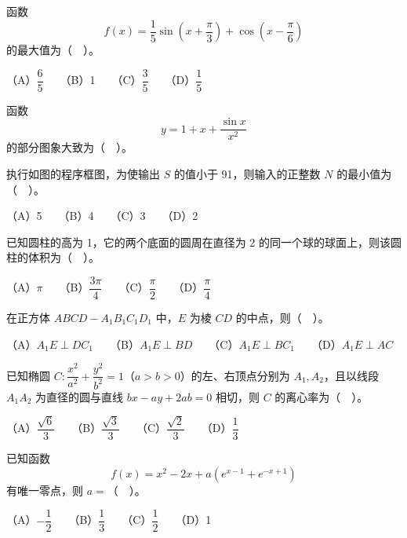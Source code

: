 \begin{question}
函数
\nopagebreak[4]
\[
f(x)=\frac{1}{5}\sin\left(x+\frac{\pi}{3}\right)+\cos\left(x-\frac{\pi}{6}\right)
\]
的最大值为（　）。

（A）\(\dfrac{6}{5}\)　　（B）1　　（C）\(\dfrac{3}{5}\)　　（D）\(\dfrac{1}{5}\)

\Needspace{0.4\textheight}
\end{question}
\begin{question}
函数
\nopagebreak[4]
\[
y=1+x+\frac{\sin x}{x^2}
\]
的部分图象大致为（　）。
\nopagebreak[4]
\begin{center}\end{center}
\nopagebreak[4]
\Needspace{0.4\textheight}
\end{question}
\begin{question}
执行如图的程序框图，为使输出 \(S\) 的值小于 91，则输入的正整数 \(N\) 的最小值为（　）。
\nopagebreak[4]
\begin{center}\end{center}
\nopagebreak[4]
（A）5　　（B）4　　（C）3　　（D）2

\end{question}
\begin{question}
已知圆柱的高为 1，它的两个底面的圆周在直径为 2 的同一个球的球面上，则该圆柱的体积为（　）。

（A）\(\pi\)　　（B）\(\dfrac{3\pi}{4}\)　　（C）\(\dfrac{\pi}{2}\)　　（D）\(\dfrac{\pi}{4}\)

\end{question}
\begin{question}
在正方体 \(ABCD-A_1B_1C_1D_1\) 中，\(E\) 为棱 \(CD\) 的中点，则（　）。

（A）\(A_1E\perp DC_1\)　　（B）\(A_1E\perp BD\)　　（C）\(A_1E\perp BC_1\)　　（D）\(A_1E\perp AC\)

\end{question}
\begin{question}
已知椭圆 \(C:\dfrac{x^2}{a^2}+\dfrac{y^2}{b^2}=1\)（\(a>b>0\)）的左、右顶点分别为 \(A_1,A_2\)，且以线段 \(A_1A_2\) 为直径的圆与直线 \(bx-ay+2ab=0\) 相切，则 \(C\) 的离心率为（　）。

（A）\(\dfrac{\sqrt{6}}{3}\)　　（B）\(\dfrac{\sqrt{3}}{3}\)　　（C）\(\dfrac{\sqrt{2}}{3}\)　　（D）\(\dfrac{1}{3}\)

\end{question}
\begin{question}
已知函数
\nopagebreak[4]
\[
f(x)=x^2-2x+a\left(e^{x-1}+e^{-x+1}\right)
\]
有唯一零点，则 \(a=\)（　）。

（A）\(-\dfrac{1}{2}\)　　（B）\(\dfrac{1}{3}\)　　（C）\(\dfrac{1}{2}\)　　（D）1

\end{question}

